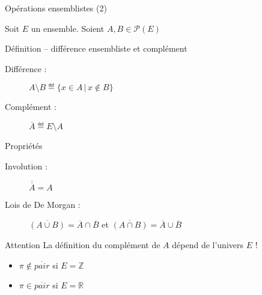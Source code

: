 
\begingroup

\begin{frame}{Opérations ensemblistes (2)}

  Soit $E$ un ensemble. Soient $A, B \in \mathscr{P}(E)$
  \begin{block}{Définition -- différence ensembliste et complément}
    \begin{description}
    \item[Différence :] $A \setminus B \eqdef \{x \in A \,|\, x \notin B\}$
    \item[Complément :] $\overline{A} \eqdef E \setminus A$
    \end{description}
  \end{block}
  \begin{block}{Propriétés}
    \begin{description}
    \item[Involution :] \alert{$\overline{\overline{A}} = A$}
    \item[Lois de De Morgan :] \alert{$\overline{(A \cup B)} = \overline{A} \cap \overline{B}$} et \alert{$\overline{(A \cap B)} = \overline{A} \cup \overline{B}$}
    \end{description}
  \end{block}
  \begin{alertblock}{Attention}
    La définition du complément de $A$ dépend de l'univers $E$ !
    \begin{itemize}
    \item $\pi \notin \overline{\mathit{pair}}$ si $E = \mathbb{Z}$
    \item $\pi \in \overline{\mathit{pair}}$ si $E = \mathbb{R}$
    \end{itemize}
  \end{alertblock}

\end{frame}

\endgroup
